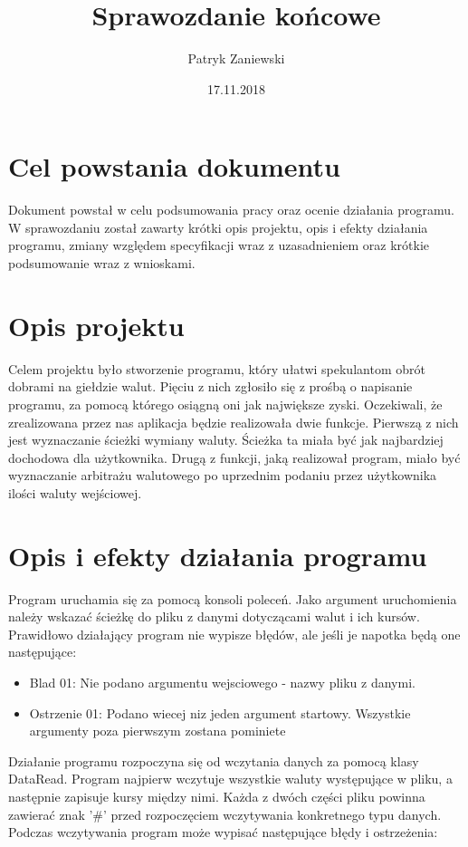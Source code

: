 \documentclass[12pt]{article}
\title{Sprawozdanie końcowe}
\author{Patryk Zaniewski}
\date{17.11.2018}
\begin{document}
\maketitle

\tableofcontents
\newpage

\section{Cel powstania dokumentu}
Dokument powstał w celu podsumowania pracy oraz ocenie działania programu. W sprawozdaniu został zawarty krótki opis projektu, opis i efekty działania programu, zmiany względem specyfikacji wraz z uzasadnieniem oraz krótkie podsumowanie wraz z wnioskami.

\section{Opis projektu}
Celem projektu było stworzenie programu, który ułatwi spekulantom obrót dobrami na giełdzie walut. Pięciu z nich zgłosiło się z prośbą o napisanie programu, za pomocą którego osiągną oni jak największe zyski. Oczekiwali, że zrealizowana przez nas aplikacja będzie realizowała dwie funkcje. Pierwszą z nich jest wyznaczanie ścieżki wymiany waluty. Ścieżka ta miała być jak najbardziej dochodowa dla użytkownika. Drugą z funkcji, jaką realizował program, miało być wyznaczanie arbitrażu walutowego po uprzednim podaniu przez użytkownika ilości waluty wejściowej.

\section{Opis i efekty działania programu}
Program uruchamia się za pomocą konsoli poleceń. Jako argument uruchomienia należy wskazać ścieżkę do pliku z danymi dotyczącami walut i ich kursów. Prawidłowo działający program nie wypisze błędów, ale jeśli je napotka będą one następujące:

\begin{itemize}
\item Blad 01: Nie podano argumentu wejsciowego - nazwy pliku z danymi.
\item Ostrzenie 01: Podano wiecej niz jeden argument startowy. Wszystkie argumenty poza pierwszym zostana pominiete
\end{itemize}


Działanie programu rozpoczyna się od wczytania danych za pomocą klasy DataRead. Program najpierw wczytuje wszystkie waluty występujące w pliku, a następnie zapisuje kursy między nimi.
Każda z dwóch części pliku powinna zawierać znak '\#' przed rozpoczęciem wczytywania konkretnego typu danych. Podczas wczytywania program może wypisać następujące błędy i ostrzeżenia:
\end{document}
